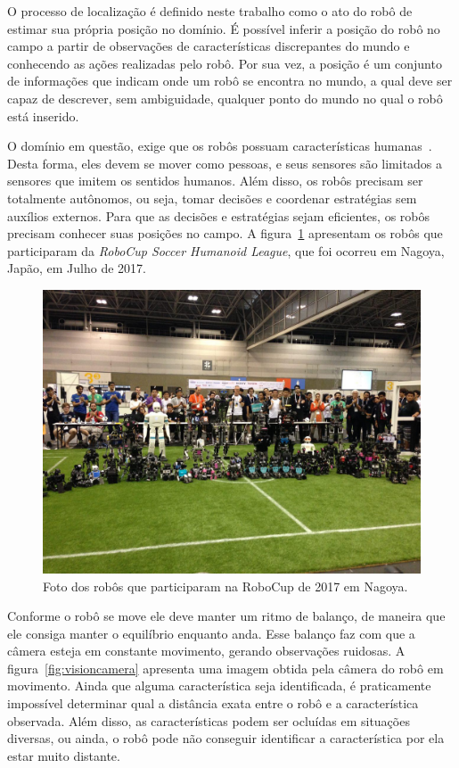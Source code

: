 \documentclass[
  12pt,       %
  oneside,
  a4paper,      %
  english,      %
  french,       %
  spanish,      %
  brazil,       %
  ]{abntex2}
\begin{document}
O processo de localização é definido neste trabalho como o ato do robô de estimar sua própria posição no domínio.
É possível inferir a posição do robô no campo a partir de observações de características discrepantes do mundo e conhecendo as ações realizadas pelo robô.
Por sua vez, a posição é um conjunto de informações que indicam onde um robô se encontra no mundo, a qual deve ser capaz de descrever, sem ambiguidade, qualquer ponto do mundo no qual o robô está inserido.

O domínio em questão, exige que os robôs possuam características humanas~\cite{art:RoboCup}.
Desta forma, eles devem se mover como pessoas, e seus sensores são limitados a sensores que imitem os sentidos humanos.
Além disso, os robôs precisam ser totalmente autônomos, ou seja, tomar decisões e coordenar estratégias sem auxílios externos.
Para que as decisões e estratégias sejam eficientes, os robôs precisam conhecer suas posições no campo.
A figura~\ref{fig:robocup} apresentam os robôs que participaram da \textit{RoboCup Soccer Humanoid League}, que foi ocorreu em Nagoya, Japão, em Julho de 2017.

\begin{figure}[b]
  \centering
  \caption{Foto dos robôs que participaram na RoboCup de 2017 em Nagoya.}\label{fig:robocup}
    \includegraphics[width=\textwidth, trim={0 5cm 0 5cm}, clip]{fig/robocup2017}
\end{figure}

Conforme o robô se move ele deve manter um ritmo de balanço, de maneira que ele consiga manter o equilíbrio enquanto anda.
Esse balanço faz com que a câmera esteja em constante movimento, gerando observações ruidosas.
A figura~\ref{fig:visioncamera} apresenta uma imagem obtida pela câmera do robô em movimento.
Ainda que alguma característica seja identificada, é praticamente impossível determinar qual a distância exata entre o robô e a característica observada.
Além disso, as características podem ser ocluídas em situações diversas, ou ainda, o robô pode não conseguir identificar a característica por ela estar muito distante.
\end{document}
